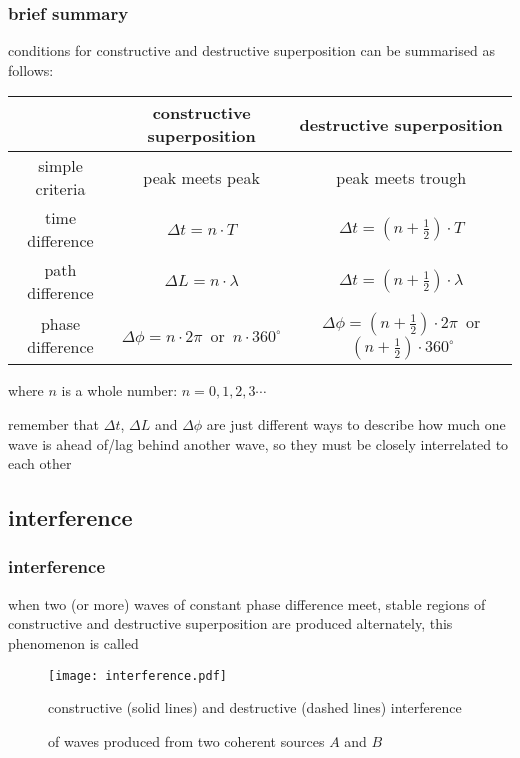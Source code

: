 \subsubsection*{brief summary}

conditions for constructive and destructive superposition can be summarised as follows:

\begin{center}
{\renewcommand{\arraystretch}{1.25}
\begin{tabular}{|c|c|c|}
	\hline
	& constructive superposition & destructive superposition \\
	\hline
	simple criteria & peak meets peak & peak meets trough \\
	\hline
	time difference & $\Delta t = n \cdot T$ & $\Delta t = \left(n+\frac{1}{2}\right) \cdot T$ \\
	\hline
	path difference & $\Delta L = n \cdot \lambda$ & $\Delta t = \left(n+\frac{1}{2}\right) \cdot \lambda$ \\
	\hline
	phase difference & $\Delta \phi = n\cdot 2\pi\,$ or $\,n\cdot 360^\circ$ & $\Delta \phi = \left(n+\frac{1}{2}\right)\cdot 2\pi \,$ or $\,\left(n+\frac{1}{2}\right)\cdot 360^\circ$ \\
	\hline
\end{tabular}
}
\end{center}

where $n$ is a whole number: $n=0, 1, 2, 3 \cdots$

remember that $\Delta t$, $\Delta L$ and $\Delta \phi$ are just different ways to describe how much one wave is ahead of/lag behind another wave, so they must be closely interrelated to each other






\subsection{interference}

\subsubsection{interference}

when two (or more) waves of constant phase difference meet, stable regions of constructive and destructive superposition are produced alternately, this phenomenon is called 



\begin{figure}[htp]
	\centering
	\texttt{[image: interference.pdf]}
	
	constructive (solid lines) and destructive (dashed lines) interference 
	
	of waves produced from two coherent sources $A$ and $B$
\end{figure}

